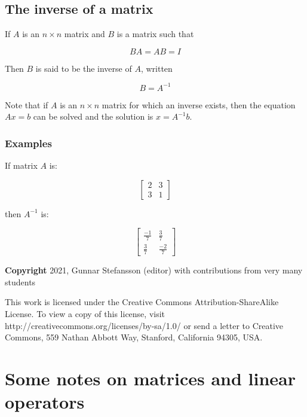 \documentclass[12pt,a4paper]{article}
\theoremstyle{regla}
\theoremstyle{remark}
\theoremstyle{definition}
\theoremstyle{nonumberbreak}
\begin{document}
\subsection{The inverse of a matrix}
\begin{fbox}
\begin{minipage}{0.97\textwidth}
If $A$ is an $n \times n$ matrix and $B$ is a matrix such that

$$ BA = AB = I$$

Then $B$ is said to be the inverse of $A$, written 

$$ B = A ^{-1} $$

Note that if $A$ is an $n \times n$ matrix for which an inverse exists, then the equation $Ax = b$ can be solved and the solution is $x = A^{-1} b$.

\end{minipage}
\end{fbox}
\subsubsection{Examples}
\begin{xmpl}

If matrix $A$ is:

$$\begin{bmatrix}
2 & 3  \\
3 & 1 
\end{bmatrix}$$

then $A ^{-1}$ is:

$$\begin{bmatrix}
\frac{-1}{7} & \frac{3}{7} \\
\frac{3}{7} & \frac{-2}{7}
\end{bmatrix}$$
\end{xmpl}

{\bf Copyright}
2021, Gunnar Stefansson (editor) with contributions from very many students

This work is licensed under the Creative Commons
Attribution-ShareAlike License. To view a copy of this license, visit
http://creativecommons.org/licenses/by-sa/1.0/ or send a letter to
Creative Commons, 559 Nathan Abbott Way, Stanford, California 94305,
USA.
\clearpage
\section{Some notes on matrices and linear operators}
\end{document}
